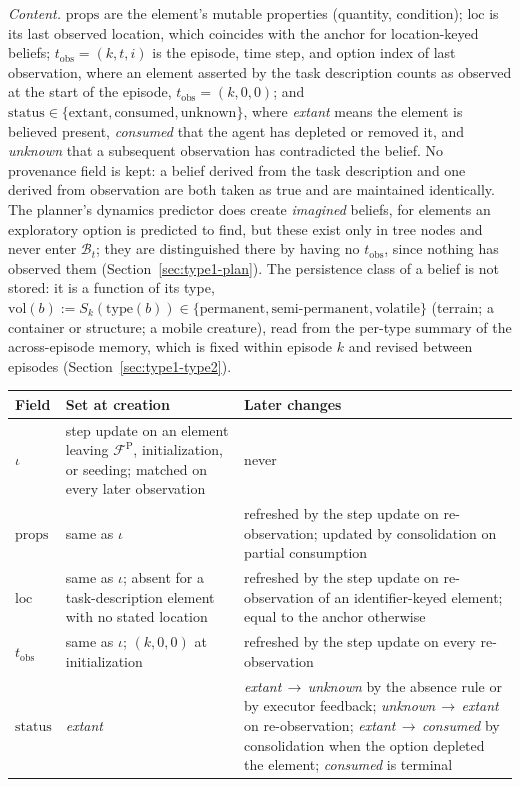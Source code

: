 \documentclass[11pt]{article}
\makeatletter
\newcommand{\calF}{\mathcal{F}}
\newcommand{\calB}{\mathcal{B}}
\newcommand{\FP}{\calF^{\mathrm{P}}}
\newcommand{\loc}{\mathrm{loc}}
\newcommand{\vol}{\mathrm{vol}}
\newcommand{\stat}{\mathrm{status}}
\newcommand{\props}{\mathrm{props}}
\newcommand{\type}{\mathrm{type}}
\newcommand{\tobs}{t_{\mathrm{obs}}}
\newenvironment{lifecycle}{\begin{center}\small\begin{tabular}{@{}>{\raggedright\arraybackslash}p{0.17\textwidth}>{\raggedright\arraybackslash}p{0.36\textwidth}>{\raggedright\arraybackslash}p{0.40\textwidth}@{}}\toprule Field & Set at creation & Later changes \\ \midrule}{\bottomrule\end{tabular}\end{center}}
\makeatother
\begin{document}
\emph{Content.} $\props$ are the element's mutable properties (quantity, condition); $\loc$ is its last observed location, which coincides with the anchor for location-keyed beliefs; $\tobs=(k,t,i)$ is the episode, time step, and option index of last observation, where an element asserted by the task description counts as observed at the start of the episode, $\tobs=(k,0,0)$; and $\stat\in\{\mathrm{extant},\mathrm{consumed},\mathrm{unknown}\}$, where \emph{extant} means the element is believed present, \emph{consumed} that the agent has depleted or removed it, and \emph{unknown} that a subsequent observation has contradicted the belief. No provenance field is kept: a belief derived from the task description and one derived from observation are both taken as true and are maintained identically. The planner's dynamics predictor does create \emph{imagined} beliefs, for elements an exploratory option is predicted to find, but these exist only in tree nodes and never enter $\calB_t$; they are distinguished there by having no $\tobs$, since nothing has observed them (Section~\ref{sec:type1-plan}). The persistence class of a belief is not stored: it is a function of its type, $\vol(b):=S_k(\type(b))\in\{\mathrm{permanent},\mathrm{semi\text{-}permanent},\mathrm{volatile}\}$ (terrain; a container or structure; a mobile creature), read from the per-type summary of the across-episode memory, which is fixed within episode $k$ and revised between episodes (Section~\ref{sec:type1-type2}).

\begin{lifecycle}
$\iota$ & step update on an element leaving $\FP$, initialization, or seeding; matched on every later observation & never \\
$\props$ & same as $\iota$ & refreshed by the step update on re-observation; updated by consolidation on partial consumption \\
$\loc$ & same as $\iota$; absent for a task-description element with no stated location & refreshed by the step update on re-observation of an identifier-keyed element; equal to the anchor otherwise \\
$\tobs$ & same as $\iota$; $(k,0,0)$ at initialization & refreshed by the step update on every re-observation \\
$\stat$ & \emph{extant} & \emph{extant}\,$\to$\,\emph{unknown} by the absence rule or by executor feedback; \emph{unknown}\,$\to$\,\emph{extant} on re-observation; \emph{extant}\,$\to$\,\emph{consumed} by consolidation when the option depleted the element; \emph{consumed} is terminal \\
\end{lifecycle}
\end{document}
